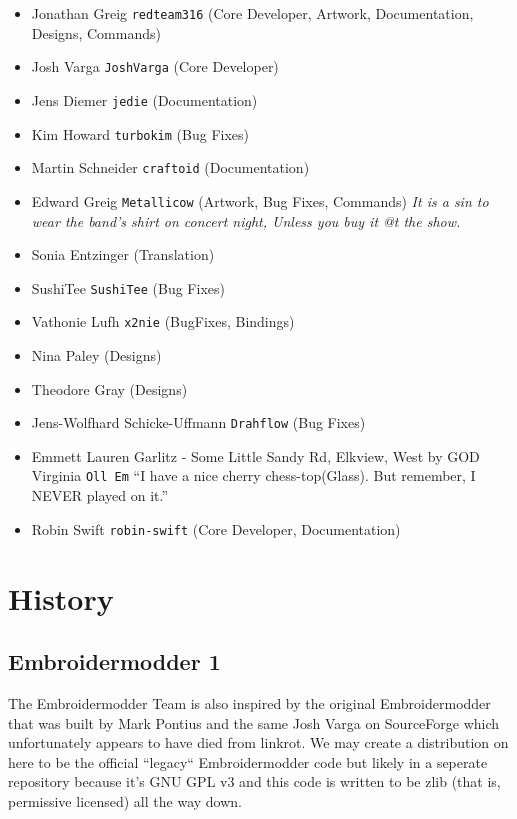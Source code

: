 \documentclass[10pt]{report}
\begin{document}
\begin{itemize}
\item Jonathan Greig \texttt{redteam316} (Core Developer, Artwork, Documentation, Designs, Commands)
\item Josh Varga \texttt{JoshVarga} (Core Developer)
\item Jens Diemer \texttt{jedie} (Documentation)
\item Kim Howard \texttt{turbokim} (Bug Fixes)
\item Martin Schneider \texttt{craftoid} (Documentation)
\item Edward Greig \texttt{Metallicow} (Artwork, Bug Fixes, Commands)
    \emph{It is a sin to wear the band's shirt on concert night, Unless you buy it @t the show.}
\item Sonia Entzinger (Translation)
\item SushiTee \texttt{SushiTee} (Bug Fixes)
\item Vathonie Lufh \texttt{x2nie} (BugFixes, Bindings)
\item Nina Paley (Designs)
\item Theodore Gray (Designs)
\item Jens-Wolfhard Schicke-Uffmann \texttt{Drahflow} (Bug Fixes)
\item Emmett Lauren Garlitz - Some Little Sandy Rd, Elkview, West by GOD Virginia \texttt{Oll Em}
    ``I have a nice cherry chess-top(Glass). But remember, I NEVER played on it.''
\item Robin Swift \texttt{robin-swift} (Core Developer, Documentation)
\end{itemize}

\section{History}

\subsection{Embroidermodder 1}

The Embroidermodder Team is also inspired by the original Embroidermodder that
was built by Mark Pontius and the same Josh Varga on SourceForge which
unfortunately appears to have died from linkrot. We may create a distribution
on here to be the official ``legacy`` Embroidermodder code but likely in a
seperate repository because it's GNU GPL v3 and this code is written to be
zlib (that is, permissive licensed) all the way down.
\end{document}
